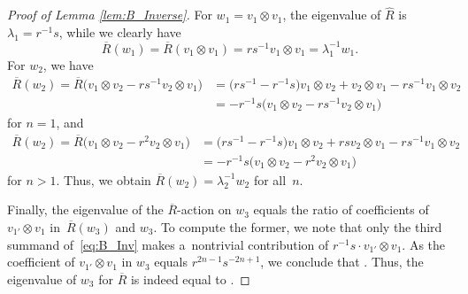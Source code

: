 \documentclass[pdftex]{sigma}
\numberwithin{equation}{section}
\begin{document}
\begin{proof}[Proof of Lemma \ref{lem:B_Inverse}]
For $w_{1} = v_{1} \otimes v_{1}$, the eigenvalue of $\hat{R}$ is $\lambda_1=r^{-1}s$, while we clearly have
\begin{displaymath}
 \overline{R}(w_1)=\overline{R}(v_{1} \otimes v_{1}) = rs^{-1} v_{1} \otimes v_{1}=\lambda^{-1}_1 w_1 .
\end{displaymath}
For $w_{2}$, we have
\begin{displaymath}
\begin{split}
 \overline{R}(w_{2}) = \overline{R}\bigl(v_{1} \otimes v_{2} - rs^{-1}v_{2} \otimes v_{1}\bigr) &=
 \bigl(rs^{-1} - r^{-1}s\bigr)v_{1} \otimes v_{2} + v_{2} \otimes v_{1} - rs^{-1}v_{1} \otimes v_{2} \\
 &=
 -r^{-1}s\bigl(v_{1} \otimes v_{2} - rs^{-1}v_{2} \otimes v_{1}\bigr)
\end{split}
\end{displaymath}
for $n = 1$, and
\begin{displaymath}
\begin{split}
 \overline{R}(w_{2}) = \overline{R}\bigl(v_{1} \otimes v_{2} - r^{2}v_{2} \otimes v_{1}\bigr) &=
 \bigl(rs^{-1} - r^{-1}s\bigr)v_{1} \otimes v_{2} + rsv_{2} \otimes v_{1} - rs^{-1}v_{1} \otimes v_{2} \\
 &=
 -r^{-1}s\bigl(v_{1} \otimes v_{2} - r^{2}v_{2} \otimes v_{1}\bigr)
\end{split}
\end{displaymath}
for $n > 1$.  Thus, we obtain $\overline{R}(w_{2})=\lambda_2^{-1} w_2$ for all~$n$.

Finally, the eigenvalue of the $\overline{R}$-action on $w_3$ equals the ratio of coefficients of $v_{1'}\otimes v_{1}$ in~$\overline{R}(w_3)$ and $w_3$. To compute the former, we note that only the third summand of~\eqref{eq:B_Inv} makes a~nontrivial contribution of $r^{-1}s\cdot v_{1'}\otimes v_{1}$. As the coefficient of $v_{1'}\otimes v_{1}$ in $w_3$ equals $r^{2n - 1}s^{-2n + 1}$, we conclude that . Thus, the eigenvalue of $w_3$ for $\overline{R}$ is indeed equal to .
\end{proof}
\end{document}
